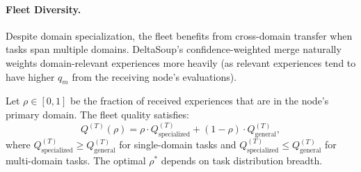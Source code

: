 \paragraph{Fleet Diversity.}
Despite domain specialization, the fleet benefits from cross-domain transfer
when tasks span multiple domains. DeltaSoup's confidence-weighted merge
naturally weights domain-relevant experiences more heavily (as relevant
experiences tend to have higher $q_m$ from the receiving node's evaluations).

\begin{proposition}
\label{prop:tradeoff}
Let $\rho \in [0,1]$ be the fraction of received experiences that are in the
node's primary domain. The fleet quality satisfies:
\begin{equation}
    Q^{(T)}(\rho) = \rho \cdot Q_{\text{specialized}}^{(T)}
                  + (1 - \rho) \cdot Q_{\text{general}}^{(T)},
\end{equation}
where $Q_{\text{specialized}}^{(T)} \geq Q_{\text{general}}^{(T)}$ for
single-domain tasks and $Q_{\text{specialized}}^{(T)} \leq Q_{\text{general}}^{(T)}$
for multi-domain tasks. The optimal $\rho^*$ depends on task distribution breadth.
\end{proposition}

